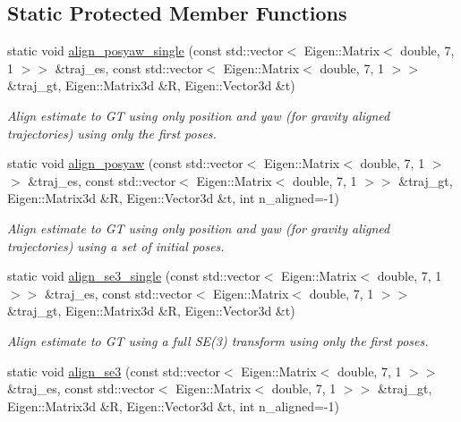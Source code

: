 \subsection*{Static Protected Member Functions}
\begin{DoxyCompactItemize}
\item 
static void \hyperlink{classov__eval_1_1AlignTrajectory_ab281d908409f24b08c3ac910b4d942f0}{align\+\_\+posyaw\+\_\+single} (const std\+::vector$<$ Eigen\+::\+Matrix$<$ double, 7, 1 $>$$>$ \&traj\+\_\+es, const std\+::vector$<$ Eigen\+::\+Matrix$<$ double, 7, 1 $>$$>$ \&traj\+\_\+gt, Eigen\+::\+Matrix3d \&R, Eigen\+::\+Vector3d \&t)
\begin{DoxyCompactList}\small\item\em Align estimate to GT using only position and yaw (for gravity aligned trajectories) using only the first poses. \end{DoxyCompactList}\item 
static void \hyperlink{classov__eval_1_1AlignTrajectory_aea1c35dee4b15301c7248c1698ee4ffa}{align\+\_\+posyaw} (const std\+::vector$<$ Eigen\+::\+Matrix$<$ double, 7, 1 $>$$>$ \&traj\+\_\+es, const std\+::vector$<$ Eigen\+::\+Matrix$<$ double, 7, 1 $>$$>$ \&traj\+\_\+gt, Eigen\+::\+Matrix3d \&R, Eigen\+::\+Vector3d \&t, int n\+\_\+aligned=-\/1)
\begin{DoxyCompactList}\small\item\em Align estimate to GT using only position and yaw (for gravity aligned trajectories) using a set of initial poses. \end{DoxyCompactList}\item 
static void \hyperlink{classov__eval_1_1AlignTrajectory_a23c39c91e3ba64678efe9734086babec}{align\+\_\+se3\+\_\+single} (const std\+::vector$<$ Eigen\+::\+Matrix$<$ double, 7, 1 $>$$>$ \&traj\+\_\+es, const std\+::vector$<$ Eigen\+::\+Matrix$<$ double, 7, 1 $>$$>$ \&traj\+\_\+gt, Eigen\+::\+Matrix3d \&R, Eigen\+::\+Vector3d \&t)
\begin{DoxyCompactList}\small\item\em Align estimate to GT using a full S\+E(3) transform using only the first poses. \end{DoxyCompactList}\item 
static void \hyperlink{classov__eval_1_1AlignTrajectory_af48d64a8e529e8ec2471ff42b439e54a}{align\+\_\+se3} (const std\+::vector$<$ Eigen\+::\+Matrix$<$ double, 7, 1 $>$$>$ \&traj\+\_\+es, const std\+::vector$<$ Eigen\+::\+Matrix$<$ double, 7, 1 $>$$>$ \&traj\+\_\+gt, Eigen\+::\+Matrix3d \&R, Eigen\+::\+Vector3d \&t, int n\+\_\+aligned=-\/1)

\end{DoxyCompactItemize}
